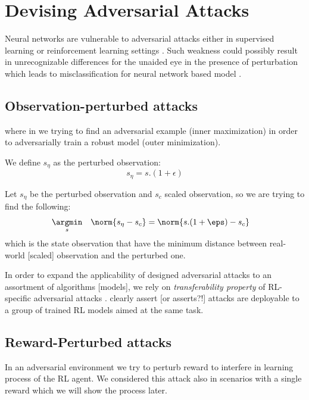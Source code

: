 \documentclass{article}
\begin{document}
\section{Devising Adversarial Attacks}
Neural networks are vulnerable to adversarial attacks either in supervised learning or reinforcement learning settings \cite{Huang2017}. Such weakness could possibly result in unrecognizable differences for the unaided eye in the presence of perturbation which leads to misclassification for neural network based model \cite{Szegedy2014, Goodfellow2014}. 


\subsection{Observation-perturbed attacks}


where in we trying to find an adversarial example (inner maximization) in order to adversarially train a robust model (outer minimization).

We define $s_\eta$ as the perturbed observation:
\begin{equation}
    s_\eta = s . (1 + \epsilon) 
\end{equation}


Let $s_\eta$ be the perturbed observation and $s_c$ scaled observation, so we are trying to find the following:
\begin{equation}
\begin{aligned}
& \underset{s}{\argmin}
& & {\norm{s_\eta - s_c}} = \norm{s . (1 + \eps) - s_c}
\end{aligned}
\end{equation}
which is the state observation that have the minimum distance between real-world [scaled] observation and the perturbed one.

In order to expand the applicability of designed adversarial attacks to an assortment of algorithms [models], we rely on \textit{transferability property} of RL-specific adversarial attacks \cite{Szegedy2014, Papernot2016, Goodfellow2014a}. \cite{Huang2017} clearly assert [or asserts?!] attacks are deployable to a group of trained RL models aimed at the same task.  

\subsection{Reward-Perturbed attacks}
In an adversarial environment we try to perturb reward to interfere in learning process of the RL agent. We considered this attack also in scenarios with a single reward which we will show the process later.
\end{document}
